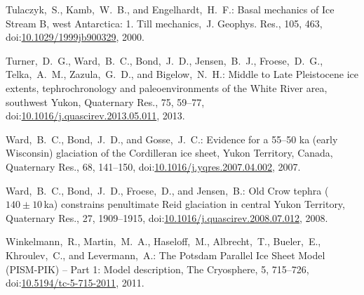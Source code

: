 \documentclass[tc, manuscript]{copernicus}
\begin{document}
\begin{thebibliography}{114}
Tulaczyk,~S., Kamb,~W.~B., and Engelhardt,~H.~F.: Basal mechanics of Ice Stream B, west Antarctica: 1. Till mechanics,~J. Geophys. Res., 105, 463,
doi:\href{http://dx.doi.org/10.1029/1999jb900329}{10.1029/1999jb900329}, 2000.


Turner,~D.~G., Ward,~B.~C., Bond,~J.~D., Jensen,~B.~J., Froese,~D.~G., Telka,~A.~M., Zazula,~G.~D., and Bigelow,~N.~H.: Middle to Late Pleistocene ice extents, tephrochronology and paleoenvironments of the White River area, southwest Yukon, Quaternary Res., 75, 59--77,
doi:\href{http://dx.doi.org/10.1016/j.quascirev.2013.05.011}{10.1016/j.quascirev.2013.05.011}, 2013.


Ward,~B.~C., Bond,~J.~D., and Gosse,~J.~C.: Evidence for a 55--50 ka (early Wisconsin) glaciation of the Cordilleran ice sheet, Yukon Territory, Canada, Quaternary Res., 68, 141--150,
doi:\href{http://dx.doi.org/10.1016/j.yqres.2007.04.002}{10.1016/j.yqres.2007.04.002}, 2007.


Ward,~B.~C., Bond,~J.~D., Froese,~D., and Jensen,~B.: Old Crow tephra ($140\pm10$\,ka) constrains penultimate Reid glaciation in central Yukon Territory, Quaternary Res., 27, 1909--1915,
doi:\href{http://dx.doi.org/10.1016/j.quascirev.2008.07.012}{10.1016/j.quascirev.2008.07.012}, 2008.


 Winkelmann,~R., Martin,~M.~A., Haseloff,~M., Albrecht,~T., Bueler,~E., Khroulev,~C., and Levermann,~A.: The Potsdam Parallel Ice Sheet Model (PISM-PIK) -- Part 1: Model description, The Cryosphere, 5, 715--726,
doi:\href{http://dx.doi.org/10.5194/tc-5-715-2011}{10.5194/tc-5-715-2011}, 2011.


\end{thebibliography}


\clearpage{}  %
\end{document}

